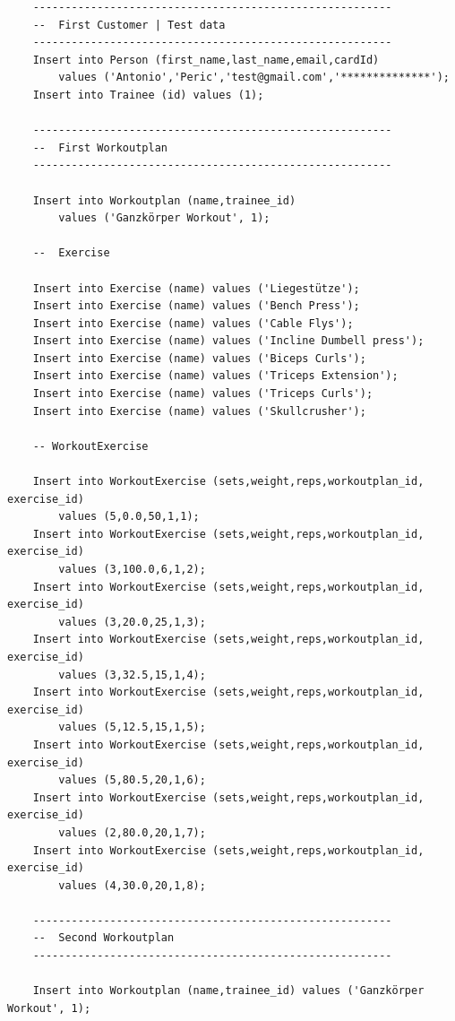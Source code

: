 \begin{verbatim}
    --------------------------------------------------------
    --  First Customer | Test data
    --------------------------------------------------------
    Insert into Person (first_name,last_name,email,cardId) 
        values ('Antonio','Peric','test@gmail.com','**************');
    Insert into Trainee (id) values (1);
    
    --------------------------------------------------------
    --  First Workoutplan
    --------------------------------------------------------
    
    Insert into Workoutplan (name,trainee_id) 
        values ('Ganzkörper Workout', 1);
    
    --  Exercise
    
    Insert into Exercise (name) values ('Liegestütze');
    Insert into Exercise (name) values ('Bench Press');
    Insert into Exercise (name) values ('Cable Flys');
    Insert into Exercise (name) values ('Incline Dumbell press');
    Insert into Exercise (name) values ('Biceps Curls');
    Insert into Exercise (name) values ('Triceps Extension');
    Insert into Exercise (name) values ('Triceps Curls');
    Insert into Exercise (name) values ('Skullcrusher');
    
    -- WorkoutExercise
    
    Insert into WorkoutExercise (sets,weight,reps,workoutplan_id, exercise_id) 
        values (5,0.0,50,1,1);
    Insert into WorkoutExercise (sets,weight,reps,workoutplan_id, exercise_id) 
        values (3,100.0,6,1,2);
    Insert into WorkoutExercise (sets,weight,reps,workoutplan_id, exercise_id) 
        values (3,20.0,25,1,3);
    Insert into WorkoutExercise (sets,weight,reps,workoutplan_id, exercise_id) 
        values (3,32.5,15,1,4);
    Insert into WorkoutExercise (sets,weight,reps,workoutplan_id, exercise_id) 
        values (5,12.5,15,1,5);
    Insert into WorkoutExercise (sets,weight,reps,workoutplan_id, exercise_id) 
        values (5,80.5,20,1,6);
    Insert into WorkoutExercise (sets,weight,reps,workoutplan_id, exercise_id) 
        values (2,80.0,20,1,7);
    Insert into WorkoutExercise (sets,weight,reps,workoutplan_id, exercise_id) 
        values (4,30.0,20,1,8);
    
    --------------------------------------------------------
    --  Second Workoutplan
    --------------------------------------------------------
    
    Insert into Workoutplan (name,trainee_id) values ('Ganzkörper Workout', 1);
    

\end{verbatim}
